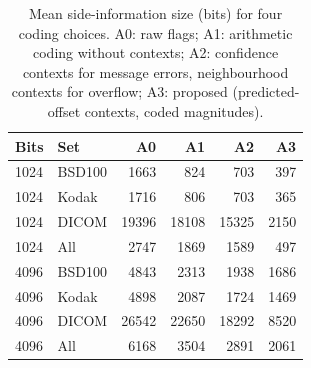 \begin{table}[t]
\centering
\caption{Mean side-information size (bits) for four coding choices. A0: raw flags; A1: arithmetic coding without contexts; A2: confidence contexts for message errors, neighbourhood contexts for overflow; A3: proposed (predicted-offset contexts, coded magnitudes).}
\label{tab:ablation}
\setlength{\tabcolsep}{4pt}
\begin{tabular}{llrrrr}
\toprule
Bits & Set & A0 & A1 & A2 & A3\\
\midrule
1024 & BSD100 & 1663 & 824 & 703 & 397\\
1024 & Kodak & 1716 & 806 & 703 & 365\\
1024 & DICOM & 19396 & 18108 & 15325 & 2150\\
1024 & All & 2747 & 1869 & 1589 & 497\\
4096 & BSD100 & 4843 & 2313 & 1938 & 1686\\
4096 & Kodak & 4898 & 2087 & 1724 & 1469\\
4096 & DICOM & 26542 & 22650 & 18292 & 8520\\
4096 & All & 6168 & 3504 & 2891 & 2061\\
\bottomrule
\end{tabular}
\end{table}
